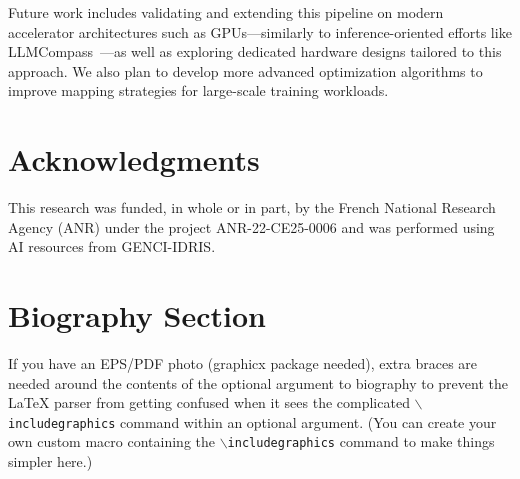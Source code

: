 \documentclass[lettersize,journal]{IEEEtran}
\begin{document}
Future work includes validating and extending this pipeline on modern accelerator architectures such as GPUs—similarly to inference-oriented efforts like LLMCompass~\cite{LLMCompass}—as well as exploring dedicated hardware designs tailored to this approach. We also plan to develop more advanced optimization algorithms to improve mapping strategies for large-scale training workloads.


\section*{Acknowledgments}
This research was funded, in whole or in part, by the French National Research Agency (ANR) under the project ANR-22-CE25-0006 and was performed using AI resources from GENCI-IDRIS.






%
%




\newpage

\section{Biography Section}
If you have an EPS/PDF photo (graphicx package needed), extra braces are
 needed around the contents of the optional argument to biography to prevent
 the LaTeX parser from getting confused when it sees the complicated
 $\backslash${\tt{includegraphics}} command within an optional argument. (You can create
 your own custom macro containing the $\backslash${\tt{includegraphics}} command to make things
 simpler here.)
 







\vfill
\end{document}
